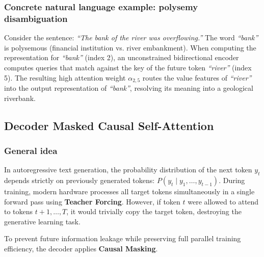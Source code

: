 \documentclass[../../main.tex]{subfiles}
\begin{document}
\subsubsection{Concrete natural language example: polysemy disambiguation}
Consider the sentence: \emph{``The bank of the river was overflowing.''}
The word \emph{``bank''} is polysemous (financial institution vs. river embankment). When computing the representation for \emph{``bank''} (index 2), an unconstrained bidirectional encoder computes queries that match against the key of the future token \emph{``river''} (index 5). The resulting high attention weight $\alpha_{2, 5}$ routes the value features of \emph{``river''} into the output representation of \emph{``bank''}, resolving its meaning into a geological riverbank.

\subsection{Decoder Masked Causal Self-Attention}
\label{subsec:masked_causal_self_attn}

\subsubsection{General idea}
In autoregressive text generation, the probability distribution of the next token $y_t$ depends strictly on previously generated tokens: $P(y_t \mid y_1, \dots, y_{t-1})$. During training, modern hardware processes all target tokens simultaneously in a single forward pass using \textbf{Teacher Forcing}. However, if token $t$ were allowed to attend to tokens $t+1, \dots, T$, it would trivially copy the target token, destroying the generative learning task.

To prevent future information leakage while preserving full parallel training efficiency, the decoder applies \textbf{Causal Masking}.
\end{document}
